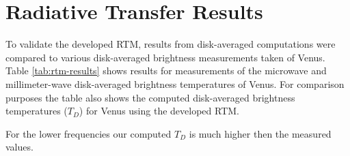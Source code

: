 \section{Radiative Transfer Results}
To validate the developed RTM, results from disk-averaged computations were compared to various disk-averaged brightness measurements taken of Venus. Table \ref{tab:rtm-results} shows results for measurements of the microwave and millimeter-wave disk-averaged brightness temperatures of Venus. For comparison purposes the table also shows the computed disk-averaged brightness temperatures ($T_D$) for Venus using the developed RTM. 

For the lower frequencies our computed $T_D$ is much higher then the measured values. %

